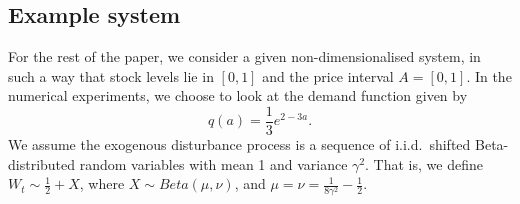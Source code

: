 \documentclass[main.tex]{subfiles}
\begin{document}
\subsection{Example system}\label{sec:bellman_example_markdown}
For the rest of the paper, we consider a given non-dimensionalised
system, in such a way that stock levels lie in $[0,1]$ and the price
interval $A=[0,1]$.
In the numerical experiments, we choose to look at the demand function
given by
\begin{equation}
  q(a)=\frac{1}{3}e^{2-3a}.
\end{equation}
We assume the exogenous disturbance process is a sequence of
i.i.d.~shifted Beta-distributed random variables with mean 1 and variance
$\gamma^2$. That is, we define $W_t\sim \frac{1}{2}+X$, where
$X\sim Beta(\mu,\nu)$, and
$\mu=\nu=\frac{1}{8\gamma^2}-\frac{1}{2}$.
\end{document}

